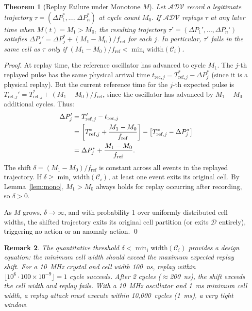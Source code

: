 \documentclass[twocolumn,10pt]{article}
\newtheorem{theorem}{Theorem}[section]
\newtheorem{remark}[theorem]{Remark}
\newcommand{\DP}{\Delta P}          %
\newcommand{\Mcyc}{M}               %
\newcommand{\fref}{f_{\mathrm{ref}}}
\newcommand{\calC}{\mathcal{C}}     %
\newcommand{\calD}{\mathcal{D}}     %
\begin{document}
\begin{theorem}[Replay Failure under Monotone $M$]
\label{thm:replay}
Let $\mathcal{ADV}$ record a legitimate trajectory $\tau =
(\DP_1^*, \ldots, \DP_n^*)$ at cycle count $M_0$. If $\mathcal{ADV}$
replays $\tau$ at any later time when $\Mcyc(t) = M_1 > M_0$, the
resulting trajectory $\tau' = (\DP_1', \ldots, \DP_n')$ satisfies
$\DP_j' = \DP_j^* + (M_1 - M_0)/\fref$ for each $j$.
In particular, $\tau'$ falls in the same cell as $\tau$ only if
$(M_1 - M_0)/\fref < \min_i \mathrm{width}(\calC_i)$.
\end{theorem}
\begin{proof}
At replay time, the reference oscillator has advanced to cycle $M_1$.
The $j$-th replayed pulse has the same physical arrival time
$t_{\mathrm{rec},j} = T_{\mathrm{ref},j}^* - \DP_j^*$ (since it is a physical replay).
But the current reference time for the $j$-th expected pulse is
$T_{\mathrm{ref},j}' = T_{\mathrm{ref},j}^* + (M_1 - M_0)/\fref$, since the oscillator
has advanced by $M_1 - M_0$ additional cycles.
Thus:
\begin{align}
  \DP_j' &= T_{\mathrm{ref},j}' - t_{\mathrm{rec},j} \notag \\
         &= \left[T_{\mathrm{ref},j}^* + \frac{M_1 - M_0}{\fref}\right]
            - \left[T_{\mathrm{ref},j}^* - \DP_j^*\right] \notag \\
         &= \DP_j^* + \frac{M_1 - M_0}{\fref}.
  \label{eq:replay-shift}
\end{align}
The shift $\delta = (M_1 - M_0)/\fref$ is constant across all events
in the replayed trajectory. If $\delta \geq \min_i \mathrm{width}(\calC_i)$,
at least one event exits its original cell. By Lemma~\ref{lem:mono},
$M_1 > M_0$ always holds for replay occurring after recording, so
$\delta > 0$.

As $M$ grows, $\delta \to \infty$, and with probability 1 over
uniformly distributed cell widths, the shifted trajectory exits
its original cell partition (or exits $\calD$ entirely), triggering
no action or an anomaly action. \qed
\end{proof}

\begin{remark}
The quantitative threshold $\delta < \min_i \mathrm{width}(\calC_i)$
provides a design equation: the minimum cell width should exceed the
maximum expected replay shift. For a 10~MHz crystal and cell width
100~ns, replay within $\lfloor 10^6 \cdot 100 \times 10^{-9} \rfloor = 1$
cycle succeeds. After 2 cycles ($\approx$200~ns), the shift exceeds
the cell width and replay fails. With a 10~MHz oscillator and 1~ms
minimum cell width, a replay attack must execute within 10,000~cycles
(1~ms), a very tight window.
\end{remark}
\end{document}
